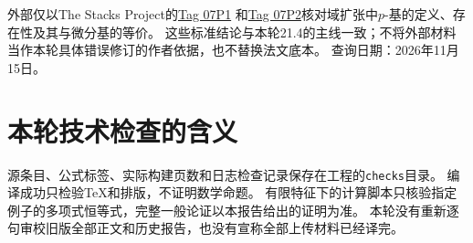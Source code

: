 外部仅以The Stacks Project的\href{https://stacks.math.columbia.edu/tag/07P1}{Tag 07P1}
和\href{https://stacks.math.columbia.edu/tag/07P2}{Tag 07P2}核对域扩张中$p$-基的定义、存在性及其与微分基的等价。
这些标准结论与本轮21.4的主线一致；不将外部材料当作本轮具体错误修订的作者依据，也不替换法文底本。
查询日期：2026年11月15日。

\section*{本轮技术检查的含义}
源条目、公式标签、实际构建页数和日志检查记录保存在工程的\texttt{checks}目录。
编译成功只检验TeX和排版，不证明数学命题。
有限特征下的计算脚本只核验指定例子的多项式恒等式，完整一般论证以本报告给出的证明为准。
本轮没有重新逐句审校旧版全部正文和历史报告，也没有宣称全部上传材料已经译完。
